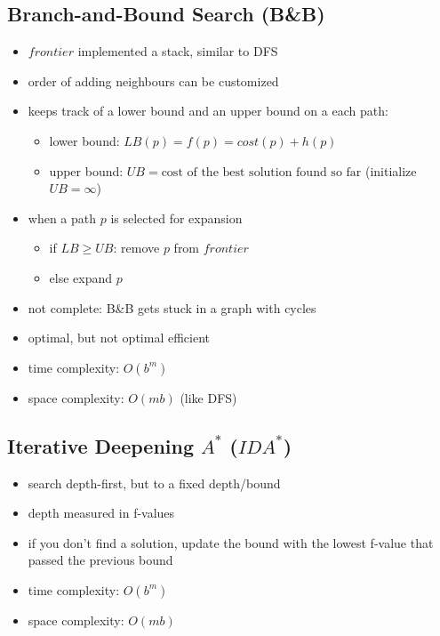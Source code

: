 \documentclass{article}
\begin{document}
\subsection{Branch-and-Bound Search (B\&B)}

\begin{itemize}
    \item $frontier$ implemented a stack, similar to DFS
    \item order of adding neighbours can be customized
    \item keeps track of a lower bound and an upper bound on a each path:
        \begin{itemize}
            \item lower bound: $LB(p) = f(p) = cost(p) + h(p)$
            \item upper bound: $UB = \text{cost of the best solution found so far}$ (initialize $UB = \infty$)
        \end{itemize}
    \item when a path $p$ is selected for expansion
        \begin{itemize}
            \item if $LB \geq UB$: remove $p$ from $frontier$
            \item else expand $p$
        \end{itemize}
    \item not complete: B\&B gets stuck in a graph with cycles
    \item optimal, but not optimal efficient
    \item time complexity: $O(b^m)$
    \item space complexity: $O(mb)$ (like DFS)
\end{itemize}

\subsection{Iterative Deepening $A^{*}$ ($IDA^{*}$)}

\begin{itemize}
    \item search depth-first, but to a fixed depth/bound
    \item depth measured in f-values
    \item if you don't find a solution, update the bound with the lowest f-value that passed the previous bound
    \item time complexity: $O(b^m)$
    \item space complexity: $O(mb)$
\end{itemize}
\end{document}
